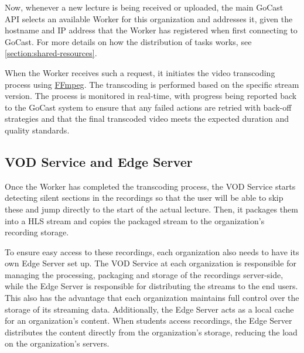 Now, whenever a new lecture is being received or uploaded, the main GoCast \ac{API} selects an available Worker for this organization and addresses it, given the hostname and IP address that the Worker has registered when first connecting to GoCast. For more details on how the distribution of tasks works, see \autoref{section:shared-resources}.

When the Worker receives such a request, it initiates the video transcoding process using \href{https://ffmpeg.org/}{FFmpeg}. The transcoding is performed based on the specific stream version\footnotemark[6]. 
The process is monitored in real-time, with progress being reported back to the GoCast system to ensure that any failed actions are retried with back-off strategies and that the final transcoded video meets the expected duration and quality standards.


\subsection{VOD Service and Edge Server}

Once the Worker has completed the transcoding process, the VOD Service starts detecting silent sections in the recordings so that the user will be able to skip these and jump directly to the start of the actual lecture. Then, it packages them into a \ac{HLS} stream and copies the packaged stream to the organization's recording storage.

To ensure easy access to these recordings, each organization also needs to have its own Edge Server set up. The VOD Service at each organization is responsible for managing the processing, packaging and storage of the recordings server-side, while the Edge Server is responsible for distributing the streams to the end users. This also has the advantage that each organization maintains full control over the storage of its streaming data.
Additionally, the Edge Server acts as a local cache for an organization's content. When students access recordings, the Edge Server distributes the content directly from the organization's storage, reducing the load on the organization's servers.

